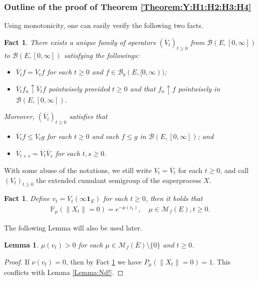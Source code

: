 \documentclass[12pt,a4paper]{amsart}
\numberwithin{equation}{section}
\theoremstyle{plain}
\newtheorem{lem}[thm]{Lemma}
\newtheorem{fact}[thm]{Fact}
\theoremstyle{definition}
\theoremstyle{remark}
\begin{document}
\subsubsection{Outline of the proof of Theorem \ref{Theorem:Y:H1:H2:H3:H4} }
\label{subsubsec:OY}
Using monotonicity, one can easily verify the following two facts.  
\begin{fact} \label{Fact:BV!} 
There exists a unique family of operators $(\overline V_t)_{t \geq 0}$ from $\mathcal B(E, [0,\infty])$ to $\mathcal B(E, [0,\infty])$ satisfying the followings: 
\begin{itemize} 
\item
$\overline V_tf = V_tf$ for each $t\geq 0$ and $f \in \mathcal B_b(E, [0,\infty))$; 
\item
$\overline V_tf_n \uparrow \overline V_t f$ pointwisely provided $t\geq 0$ and that $f_n \uparrow f$ pointwisely in $\mathcal B(E, [0,\infty])$. 
\end{itemize}
Moreover, $(\overline V_t)_{t\geq 0}$ satisfies that 
\begin{itemize}
\item
$\overline V_t f \leq \overline V_t g$ for each $t\geq 0$ and each $f\leq g$ in $\mathcal B(E,[0,\infty])$; and
\item 
$\overline V_{t+s} = \overline V_t \overline V_s$ for each $t, s\geq 0$. 
\end{itemize}
\end{fact}
With some abuse of the notations, we still write $V_t = \overline V_t$ for each $t\geq 0$, and call $(V_t)_{t\geq 0}$ the extended cumulant semigroup of the superprocess $X$.
\begin{fact} \label{Fact:sv1!} 
Define $v_t = V_t(\infty\mathbf 1_E)$ for each $t\geq 0$, then it holds that 
\begin{align}
\mathbb P_\mu (\|X_t\| = 0) 
= e^{- \mu (v_t)}, 
\quad \mu \in \mathcal M_f(E), t\geq 0.
\end{align}
\end{fact}
The following Lemma will also be used later.
\begin{lem} \label{Lemma:sv2!} 
$\mu(v_t) > 0$ for each $\mu \in \mathcal M_f(E)\setminus\{0\}$ and $t \geq 0$.
\end{lem}
\begin{proof} 
If $\nu(v_t) = 0$, then by Fact \ref{Fact:sv1!} we have $P_\mu(\|X_t \| = 0) = 1$.
This conflicts with Lemma \ref{Lemma:Nd!}.
\end{proof}
\end{document}
